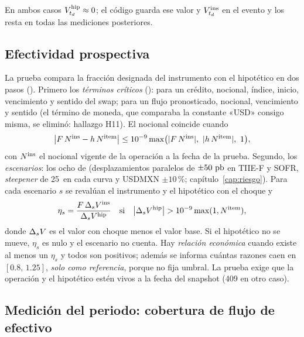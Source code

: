 En ambos casos $V^{\mathrm{hip}}_{t_d}\approx 0$; el código guarda ese valor y $V^{\mathrm{ins}}_{t_d}$ en el evento y
los resta en todas las mediciones posteriores.

\subsection{Efectividad prospectiva}\label{sec:cap10-prospectiva}

La prueba compara la fracción designada del instrumento con el hipotético en dos pasos
(). Primero los \emph{términos críticos}
(): para un crédito, nocional, índice, inicio, vencimiento y
sentido del swap; para un flujo pronosticado, nocional, vencimiento y sentido (el término de moneda, que comparaba la
constante «USD» consigo misma, se eliminó: hallazgo H11). El nocional coincide cuando
\begin{equation}\label{eq:cap10-nocional}
  \bigl|F\,\Nom^{\mathrm{ins}} - h\,\Nom^{\mathrm{item}}\bigr| \le 10^{-9}\max\bigl(|F\,\Nom^{\mathrm{ins}}|,\ |h\,\Nom^{\mathrm{item}}|,\ 1\bigr),
\end{equation}
con $N^{\mathrm{ins}}$ el nocional vigente de la operación a la fecha de la prueba. Segundo, los \emph{escenarios}: los
ocho de  (desplazamientos paralelos de $\pm 50~\textup{pb}$ en TIIE-F y
SOFR, \emph{steepener} de 25~\pb en cada curva y USDMXN $\pm 10\,\%$; capítulo~\ref{cap:riesgo}). Para cada escenario $s$
se revalúan el instrumento y el hipotético con el choque y
\begin{equation}\label{eq:cap10-razon}
  \eta_s = \frac{F\,\Delta_sV^{\mathrm{ins}}}{\Delta_sV^{\mathrm{hip}}}
  \quad\text{si}\quad \bigl|\Delta_sV^{\mathrm{hip}}\bigr| > 10^{-9}\max(1, N^{\mathrm{item}}),
\end{equation}
donde $\Delta_sV$ es el valor con choque menos el valor base. Si el hipotético no se mueve, $\eta_s$ es nulo y el
escenario no cuenta. Hay \emph{relación económica} cuando existe al menos un $\eta_s$ y todos son positivos; además se
informa cuántas razones caen en $[0.8,\,1.25]$, \emph{solo como referencia}, porque \citet{iasb2014} no fija umbral.
La prueba exige que la operación y el hipotético estén vivos a la fecha del snapshot (409 en otro caso).

\subsection{Medición del periodo: cobertura de flujo de efectivo}\label{sec:cap10-medicion}

